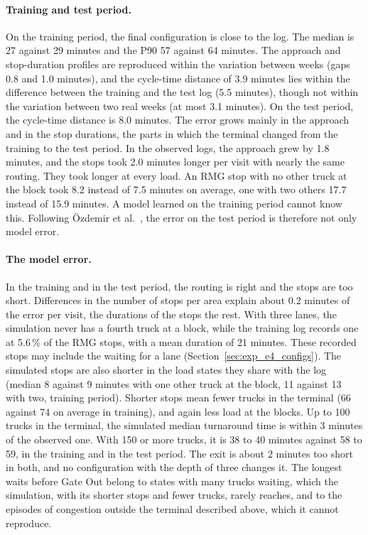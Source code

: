 \paragraph{Training and test period.} On the training period, the final
configuration is close to the log. The median is 27 against 29 minutes and the P90 57
against 64 minutes. The approach and stop-duration profiles are reproduced within the
variation between weeks (gaps 0.8 and 1.0 minutes), and the cycle-time distance of
3.9 minutes lies within the difference between the training and the test log
(5.5 minutes), though not within the variation between two real weeks (at most
3.1 minutes). On the test period, the cycle-time distance is 8.0
minutes. The error grows mainly in the approach and in the stop durations, the parts
in which the terminal changed from the training to the test period. In the observed
logs, the approach grew by 1.8 minutes, and the stops took 2.0 minutes longer per visit with
nearly the same routing. They took longer at every load. An RMG stop with no other
truck at the block took 8.2 instead of 7.5 minutes on average, one with two others
17.7 instead of 15.9 minutes. A model learned on the training period cannot know
this. Following Özdemir et al.\ \cite{Oezdemir2025RethinkingBPS}, the error on the
test period is therefore not only model error.

\paragraph{The model error.} In the training and in the test period, the routing is
right and the stops are too short. Differences in the number of stops per area explain about 0.2 minutes of the error
per visit, the durations of the stops the rest. With three lanes, the simulation never has a fourth
truck at a block, while the training log records one at 5.6\,\% of the RMG stops, with
a mean duration of 21 minutes. These recorded stops may include the waiting for a lane
(Section~\ref{sec:exp_e4_configs}). The simulated stops are also shorter in the load
states they share with the log (median 8 against 9 minutes with one other truck at the
block, 11 against 13 with two, training period). Shorter stops mean fewer trucks in
the terminal (66 against 74 on average in training), and again less load at the
blocks. Up to 100 trucks in the terminal, the simulated median turnaround time is
within 3 minutes of the observed one. With 150 or more trucks, it is 38 to 40 minutes
against 58 to 59, in the training and in the test period. The exit is about 2 minutes
too short in both, and no configuration with the depth of three changes it. The longest waits
before Gate Out belong to states with many trucks waiting, which the simulation, with
its shorter stops and fewer trucks, rarely reaches, and to the episodes of congestion
outside the terminal described above, which it cannot reproduce.

